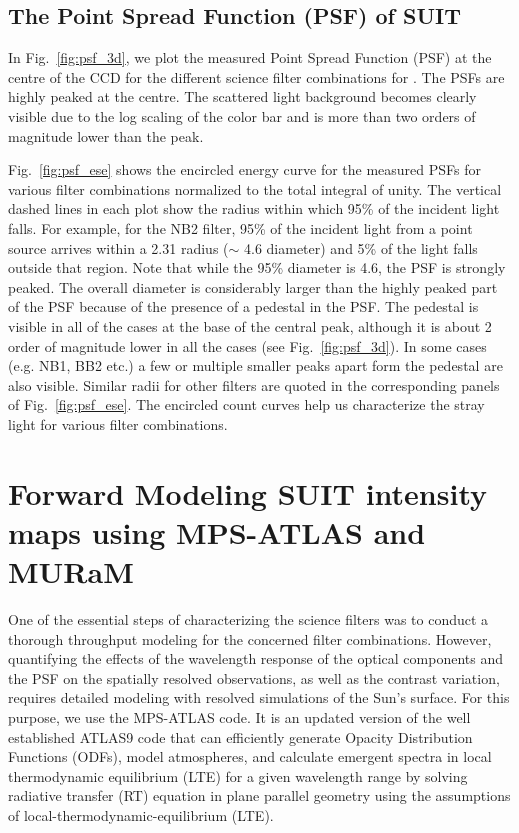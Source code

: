 \subsection{The Point Spread Function (PSF) of SUIT} \label{sec:psf}

In Fig.~\ref{fig:psf_3d}, we plot the measured Point Spread Function (PSF) at the centre of the CCD for the different science filter combinations for {\suit}. The PSFs are highly peaked at the centre. The scattered light background becomes clearly visible due to the log scaling of the color bar and is more than two orders of magnitude lower than the peak.

Fig.~\ref{fig:psf_ese} shows the encircled energy curve for the measured PSFs for various filter combinations normalized to the total integral of unity. The vertical dashed lines in each plot show the radius within which 95\% of the incident light falls. For example, for the NB2 filter, 95\% of the incident light from a point source arrives within a 2.31{\arcsec} radius ($\sim$ 4.6{\arcsec} diameter) and 5\% of the light falls outside that region. Note that while the 95\% diameter is 4.6{\arcsec}, the PSF is strongly peaked. The overall diameter is considerably larger than the highly peaked part of the PSF because of the presence of a pedestal in the PSF. The pedestal is visible in all of the cases at the base of the central peak, although it is about 2 order of magnitude lower in all the cases (see Fig.~\ref{fig:psf_3d}). In some cases (e.g. NB1, BB2 etc.) a few or multiple smaller peaks apart form the pedestal are also visible. Similar radii for other filters are quoted in the corresponding panels of Fig.~\ref{fig:psf_ese}. The encircled count curves help us characterize the stray light for various filter combinations.

\section{Forward Modeling SUIT intensity maps using MPS-ATLAS and MURaM} \label{sec:mps}

One of the essential steps of characterizing the science filters was to conduct a thorough throughput modeling for the concerned filter combinations. However, quantifying the effects of the wavelength response of the optical components and the PSF on the spatially resolved observations, as well as the contrast variation, requires detailed modeling with resolved simulations of the Sun's surface. For this purpose, we use the MPS-ATLAS code. It is an updated version of the well established ATLAS9 \citep{atlas9} code that can efficiently generate Opacity Distribution Functions (ODFs), model atmospheres, and calculate emergent spectra in local thermodynamic equilibrium (LTE) for a given wavelength range by solving radiative transfer (RT) equation in plane parallel geometry using the assumptions of local-thermodynamic-equilibrium (LTE).

